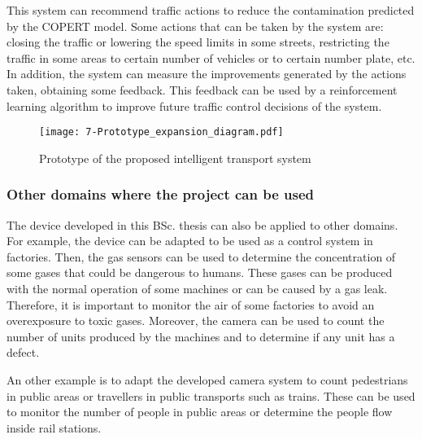 This system can recommend traffic actions to reduce the contamination predicted by the COPERT model. Some actions that can be taken by the system are: closing the traffic or lowering the speed limits in some streets, restricting the traffic in some areas to certain number of vehicles or to certain number plate, etc. In addition, the system can measure the improvements generated by the actions taken, obtaining some feedback. This feedback can be used by a reinforcement learning algorithm to improve future traffic control decisions of the system.

\begin{figure}[!h]
	\begin{center}
		\texttt{[image: 7-Prototype\_expansion\_diagram.pdf]}
		\caption{Prototype of the proposed intelligent transport system}
		\label{fig:7-Prototype_expansion_diagram}
	\end{center}
\end{figure}


\subsection{Other domains where the project can be used}
The device developed in this \ac{BSc.} thesis can also be applied to other domains. For example, the device can be adapted to be used as a control system in factories. Then, the gas sensors can be used to determine the concentration of some gases that could be dangerous to humans. These gases can be produced with the normal operation of some machines or can be caused by a gas leak. Therefore, it is important to monitor the air of some factories to avoid an overexposure to toxic gases. Moreover, the camera can be used to count the number of units produced by the machines and to determine if any unit has a defect.

An other example is to adapt the developed camera system to count pedestrians in public areas or travellers in public transports such as trains. These can be used to monitor the number of people in public areas or determine the people flow inside rail stations.





\chapter{} %
\label{chap:conclusiones}






